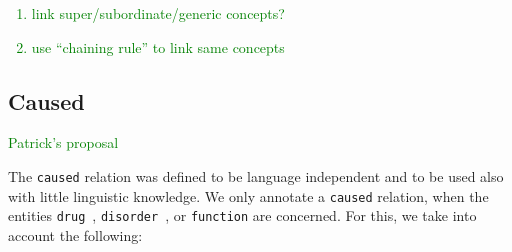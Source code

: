 \documentclass[12pt]{article}
\theoremstyle{definition}
\newcommand{\dis}{\texttt{disorder}\ }
\newcommand{\dr}{\texttt{drug}\ }
\begin{document}
\textcolor{green}{
\begin{enumerate}
    \item link super/subordinate/generic concepts? 
    \item use ``chaining rule'' to link same concepts
\end{enumerate}
}


\subsection{Caused}\label{rel_caused}

\textcolor{green}{Patrick's proposal}

The \texttt{caused} relation was defined to be language independent and to be used also with little linguistic knowledge.
We only annotate a \texttt{caused} relation, when the entities \dr, \dis, or \texttt{function} are concerned. 
For this, we take into account the following:
\end{document}
